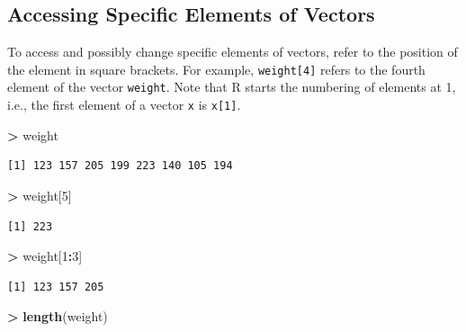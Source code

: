 \documentclass[
]{krantz}
\makeatletter
\newenvironment{Shaded}{\begin{snugshade}}{\end{snugshade}}
\newcommand{\DecValTok}[1]{\textcolor[rgb]{0.06,0.06,0.06}{#1}}
\newcommand{\KeywordTok}[1]{\textcolor[rgb]{0.27,0.27,0.27}{\textbf{#1}}}
\newcommand{\NormalTok}[1]{#1}
\newcommand{\OperatorTok}[1]{\textcolor[rgb]{0.43,0.43,0.43}{\textbf{#1}}}
\newcommand{\StringTok}[1]{\textcolor[rgb]{0.5,0.5,0.5}{#1}}
\newenvironment{kframe}{%
\medskip{}
\setlength{\fboxsep}{.8em}
 \def\at@end@of@kframe{}%
 \ifinner\ifhmode%
  \def\at@end@of@kframe{\end{minipage}}%
  \begin{minipage}{\columnwidth}%
 \fi\fi%
 \def\FrameCommand##1{\hskip\@totalleftmargin \hskip-\fboxsep
 \colorbox{shadecolor}{##1}\hskip-\fboxsep
     \hskip-\linewidth \hskip-\@totalleftmargin \hskip\columnwidth}%
 \MakeFramed {\advance\hsize-\width
   \@totalleftmargin\z@ \linewidth\hsize
   \@setminipage}}%
 {\par\unskip\endMakeFramed%
 \at@end@of@kframe}
\renewenvironment{Shaded}{\begin{kframe}}{\end{kframe}}
\makeatother
\begin{document}
\hypertarget{accessing-specific-elements-of-vectors}{%
\subsection{Accessing Specific Elements of Vectors}\label{accessing-specific-elements-of-vectors}}

To access and possibly change specific elements of vectors, refer to the position of the element in square brackets. For example, \texttt{weight{[}4{]}} refers to the fourth element of the vector \texttt{weight}. Note that R starts the numbering of elements at 1, i.e., the first element of a vector \texttt{x} is \texttt{x{[}1{]}}.

\begin{Shaded}
\begin{Highlighting}[]
\OperatorTok{\textgreater{}}\StringTok{ }\NormalTok{weight}
\end{Highlighting}
\end{Shaded}

\begin{verbatim}
[1] 123 157 205 199 223 140 105 194
\end{verbatim}

\begin{Shaded}
\begin{Highlighting}[]
\OperatorTok{\textgreater{}}\StringTok{ }\NormalTok{weight[}\DecValTok{5}\NormalTok{]}
\end{Highlighting}
\end{Shaded}

\begin{verbatim}
[1] 223
\end{verbatim}

\begin{Shaded}
\begin{Highlighting}[]
\OperatorTok{\textgreater{}}\StringTok{ }\NormalTok{weight[}\DecValTok{1}\OperatorTok{:}\DecValTok{3}\NormalTok{]}
\end{Highlighting}
\end{Shaded}

\begin{verbatim}
[1] 123 157 205
\end{verbatim}

\begin{Shaded}
\begin{Highlighting}[]
\OperatorTok{\textgreater{}}\StringTok{ }\KeywordTok{length}\NormalTok{(weight)}
\end{Highlighting}
\end{Shaded}
\end{document}
